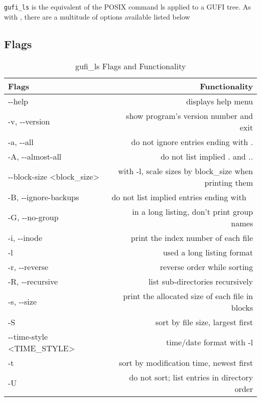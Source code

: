 \section{\gufils}
\texttt{gufi\_ls} is the equivalent of the POSIX command ls applied to
a GUFI tree. As with \gufifind, there are a multitude of options
available listed below

\subsection{Flags}
\begin{table} [h]
  \centering
  \begin{tabular}{| l | r |}
    \hline
    Flags & Functionality \\
    \hline
    -{}-help & displays help menu \\
    \hline
    -v, -{}-version & show program's version number and exit \\
    \hline
    -a, -{}-all & do not ignore entries ending with . \\
    \hline
    -A, -{}-almost-all & do not list implied . and .. \\
    \hline
    -{}-block-size \textless block\_size\textgreater & with -l, scale sizes by block\_size when printing them \\
    \hline
    -B, -{}-ignore-backups & do not list implied entries ending with ~ \\
    \hline
    -G, -{}-no-group & in a long listing, don't print group names \\
    \hline
    -i, -{}-inode & print the index number of each file \\
    \hline
    -l & used a long listing format \\
    \hline
    -r, -{}-reverse & reverse order while sorting \\
    \hline
    -R, -{}-recursive & list sub-directories recursively \\
    \hline
    -s, -{}-size & print the allocated size of each file in blocks \\
    \hline
    -S & sort by file size, largest first \\
    \hline
    -{}-time-style \textless TIME\_STYLE\textgreater & time/date format with -l \\
    \hline
    -t & sort by modification time, newest first \\
    \hline
    -U & do not sort; list entries in directory order \\
    \hline
  \end{tabular}
  \caption{\label{fig:gufi_ls flags}{gufi\_ls Flags and Functionality}}
\end{table}

